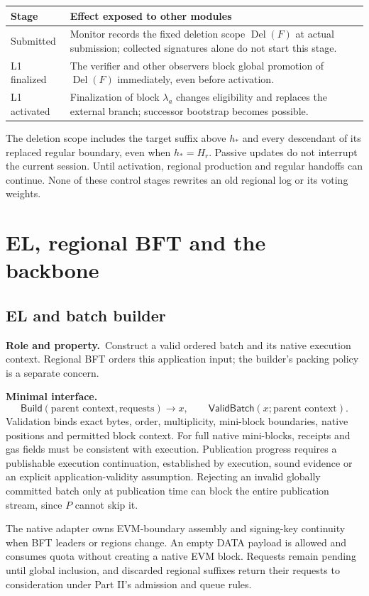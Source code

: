 \documentclass[11pt,a4paper]{article}
\newcommand{\api}[1]{\ensuremath{\mathsf{#1}}}
\newcommand{\Del}{\operatorname{Del}}
\newcommand{\role}{\textbf{Role and property.}\ }
\newcommand{\iface}{\textbf{Minimal interface.}\ }
\begin{document}
\begin{center}\small
\begin{tabularx}{\linewidth}{@{}p{.21\linewidth}Y@{}}
\toprule Stage & Effect exposed to other modules\\\midrule
Submitted & Monitor records the fixed deletion scope $\Del(F)$ at
actual submission; collected signatures alone do not start this stage.\\
L1 finalized & The verifier and other observers block global promotion of
$\Del(F)$ immediately, even before activation.\\
L1 activated & Finalization of block $\lambda_a$ changes eligibility
and replaces the external branch; successor bootstrap becomes possible.\\\bottomrule
\end{tabularx}
\end{center}
The deletion scope includes the target suffix above $h_*$ and every
descendant of its replaced regular boundary, even when $h_*=H_r$.
Passive updates do not interrupt the current session. Until activation,
regional production and regular handoffs can continue. None of these
control stages rewrites an old regional log or its voting weights.

\section{EL, regional BFT and the backbone}\label{sec:sequencing}
\subsection{EL and batch builder}
\role Construct a valid ordered batch and its native execution context.
Regional BFT orders this application input; the builder's packing policy
is a separate concern.

\iface
\[
 \api{Build}(\text{parent context},\text{requests})\to x,\qquad
 \api{ValidBatch}(x;\text{parent context}).
\]
Validation binds exact bytes, order, multiplicity, mini-block boundaries,
native positions and permitted block context. For full native mini-blocks,
receipts and gas fields must be consistent with execution. Publication
progress requires a publishable execution continuation, established by
execution, sound evidence or an explicit application-validity assumption.
Rejecting an invalid globally committed batch only at publication time
can block the entire publication stream, since $P$ cannot skip it.

The native adapter owns EVM-boundary assembly and signing-key continuity
when BFT leaders or regions change. An empty DATA payload is allowed and
consumes quota without creating a native EVM block. Requests remain pending
until global inclusion, and discarded regional suffixes return their
requests to consideration under Part II's admission and queue rules.
\end{document}
